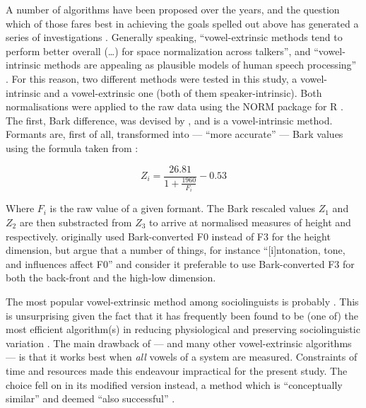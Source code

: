 A number of algorithms have been proposed over the years, and the question which of those fares best in achieving the goals spelled out above has generated a series of investigations \parencites(among others:)(){hindle1978}{disner1980}{adanketal2004}. Generally speaking, ``vowel-extrinsic methods tend to perform better overall (\ldots) for  space normalization across talkers'', and ``vowel-intrinsic methods are appealing as  plausible models of human speech processing'' \parencite[1440]{clopper2009}.
For this reason, two different  methods were tested in this study, a vowel-intrinsic and a vowel-extrinsic one (both of them speaker-intrinsic).
Both normalisations were applied to the raw data using the NORM package for R \parencite{kendallthomas2014}.
The first, Bark difference, was devised by \textcite{syrdalgopal1986}, and is a vowel-intrinsic method.
Formants are, first of all, transformed into ---  ``more accurate'' \parencite[1431--1432]{clopper2009} --- Bark values using the formula taken from \textcite{traunmueller1990}:

\begin{equation}
	Z_{i} = \frac{26.81}{1 + \frac{1960}{F_{i}}} - 0.53
\end{equation}

Where \(F_{i}\) is the raw value of a given formant. The Bark rescaled values \(Z_{1}\) and \(Z_{2}\) are then substracted from \(Z_{3}\) to arrive at normalised measures of height and  respectively. \citeauthor{syrdalgopal1986} originally used Bark-converted F0 instead of F3 for the height dimension, but \textcite{kendallthomas2014} argue that a number of things, for instance ``[i]ntonation, tone, and  influences affect F0'' and consider it preferable to use Bark-converted F3 for both the back-front and the high-low dimension.

The most popular vowel-extrinsic  method among sociolinguists is probably \textcite{lobanov1971}.
This is unsurprising given the fact that it has frequently been found to be (one of) the most efficient algorithm(s) in reducing physiological and preserving sociolinguistic variation \parencite[cf.][1440]{clopper2009}.
The main drawback of \citeauthor{lobanov1971} --- and many other vowel-extrinsic algorithms --- is that it works best when \emph{all} vowels of a system are measured.
Constraints of time and resources made this endeavour impractical for the present study.
The choice fell on \textcite{wattfabricius2002} in its modified version \parencite{fabriciusetal2009} instead, a method which is ``conceptually similar'' and deemed ``also successful'' \parencite[1440]{clopper2009}.

